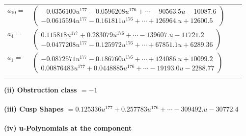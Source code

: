 \documentclass[1p]{elsarticle_modified}
\theoremstyle{definition}
\begin{document}
\begin{tabular}{m{7pt} m{180pt} m{7pt} m{180pt} }
\flushright $a_{10}=$&$\begin{pmatrix}-0.0356100 u^{177}-0.0596208 u^{176}+\cdots-90563.5 u-10087.6\\-0.0615594 u^{177}-0.161811 u^{176}+\cdots+126964. u+12600.5\end{pmatrix}$ \\
\flushright $a_{4}=$&$\begin{pmatrix}0.115818 u^{177}+0.283079 u^{176}+\cdots-139607. u-11721.2\\-0.0477208 u^{177}-0.125972 u^{176}+\cdots+67851.1 u+6289.36\end{pmatrix}$ \\
\flushright $a_{1}=$&$\begin{pmatrix}-0.0872571 u^{177}-0.186760 u^{176}+\cdots+124086. u+10099.2\\0.00876483 u^{177}+0.0448885 u^{176}+\cdots-19193.0 u-2288.77\end{pmatrix}$\\&\end{tabular}
\flushleft \textbf{(ii) Obstruction class $= -1$}\\~\\
\flushleft \textbf{(iii) Cusp Shapes $= 0.125336 u^{177}+0.257783 u^{176}+\cdots-309492. u-30772.4$}\\~\\
\newpage\renewcommand{\arraystretch}{1}
\flushleft \textbf{(iv) u-Polynomials at the component}\newline \\
\end{document}
